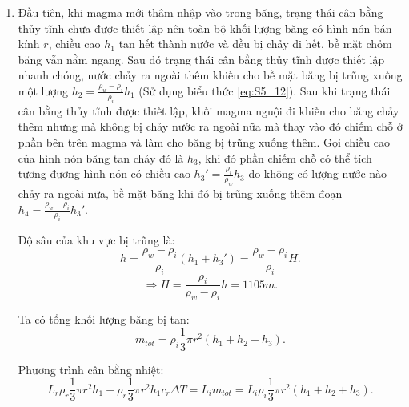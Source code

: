 \begin{enumerate}[label=(\alph*)]
\begin{enumerate}[label=(\roman*)]
    Với $y_2= \frac{h}{r}x + D$:
    \begin{equation}
        \Longrightarrow y_1= -\frac{\rho_i}{\rho_w-\rho_i}\frac{h}{r}x +\frac{\rho_i}{\rho_w-\rho_i}h.
    \end{equation}
    Từ đây ta có thể thấy $y_1$ có dạng đường thẳng. Ngoài ra, do hệ số góc của $y_1$ âm và do đối xứng quay, phần nước ở dưới chỏm băng có hình dạng là một hình nón úp. Ta dễ thấy liên hệ độ sâu khu vực bị trũng xuống với chiều cao hình nón được tạo thành:
    \begin{equation}
    \label{eq:S5_12}
        H=\frac{\rho_i}{\rho_w-\rho_i}h.
    \end{equation}
    \item Đầu tiên, khi magma mới thâm nhập vào trong băng, trạng thái cân bằng thủy tĩnh chưa được thiết lập nên toàn bộ khối lượng băng có hình nón bán kính $r$, chiều cao $h_1$ tan hết thành nước và đều bị chảy đi hết, bề mặt chỏm băng vẫn nằm ngang. Sau đó trạng thái cân bằng thủy tĩnh được thiết lập nhanh chóng, nước chảy ra ngoài thêm khiến cho bề mặt băng bị trũng xuống một lượng $h_2=\frac{\rho_w-\rho_i}{\rho_i}h_1$ (Sử dụng biểu thức \ref{eq:S5_12}). Sau khi trạng thái cân bằng thủy tĩnh được thiết lập, khối magma nguội đi khiến cho băng chảy thêm nhưng mà không bị chảy nước ra ngoài nữa mà thay vào đó chiếm chỗ ở phần bên trên magma và làm cho băng bị trũng xuống thêm. Gọi chiều cao của hình nón băng tan chảy đó là $h_3$, khi đó phần chiếm chỗ có thể tích tương đương hình nón có chiều cao $h_3'=\frac{\rho_i}{\rho_w}h_3$ do không có lượng nước nào chảy ra ngoài nữa, bề mặt băng khi đó bị trũng xuống thêm đoạn $h_4=\frac{\rho_w-\rho_i}{\rho_i}h_3'$.

    Độ sâu của khu vực bị trũng là: 
    \begin{equation}
        h=\frac{\rho_w-\rho_i}{\rho_i}(h_1+h_3') = \frac{\rho_w-\rho_i}{\rho_i}H.
    \end{equation}
    \begin{equation}
        \Longrightarrow H=\frac{\rho_i}{\rho_w-\rho_i}h = 1105\si{m}.
    \end{equation}

    Ta có tổng khối lượng băng bị tan:
    \begin{equation}
        m_{tot}= \rho_i\frac{1}{3}\pi r^2(h_1+h_2+h_3).
    \end{equation}   

    Phương trình cân bằng nhiệt:
    \begin{equation}
    \label{eq:S5_16}
        L_r\rho_r\frac{1}{3}\pi r^2h_1 + \rho_r\frac{1}{3}\pi r^2h_1c_r\Delta T= L_im_{tot} = L_i\rho_i\frac{1}{3}\pi r^2(h_1+h_2+h_3).
    \end{equation}


\end{enumerate}
\end{enumerate}
